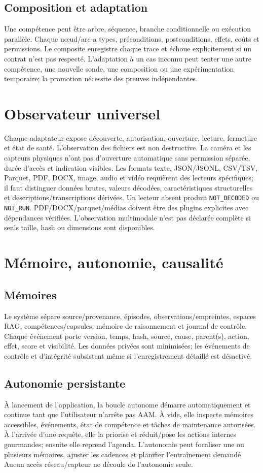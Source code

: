 \documentclass[11pt,a4paper]{report}
\begin{document}
\section{Composition et adaptation}Une compétence peut être arbre, séquence, branche conditionnelle ou exécution parallèle. Chaque nœud/arc a types, préconditions, postconditions, effets, coûts et permissions. Le composite enregistre chaque trace et échoue explicitement si un contrat n'est pas respecté. L'adaptation à un cas inconnu peut tenter une autre compétence, une nouvelle sonde, une composition ou une expérimentation temporaire; la promotion nécessite des preuves indépendantes.

\chapter{Observateur universel}
Chaque adaptateur expose découverte, autorisation, ouverture, lecture, fermeture et état de santé. L'observation des fichiers est non destructive. La caméra et les capteurs physiques n'ont pas d'ouverture automatique sans permission séparée, durée d'accès et indication visibles. Les formats texte, JSON/JSONL, CSV/TSV, Parquet, PDF, DOCX, image, audio et vidéo requièrent des lecteurs spécifiques; il faut distinguer données brutes, valeurs décodées, caractéristiques structurelles et descriptions/transcriptions dérivées. Un lecteur absent produit \texttt{NOT\_DECODED} ou \texttt{NOT\_RUN}. PDF/DOCX/parquet/médias doivent être des plugins explicites avec dépendances vérifiées. L'observation multimodale n'est pas déclarée complète si seuls taille, hash ou dimensions sont disponibles.

\chapter{Mémoire, autonomie, causalité}
\section{Mémoires}Le système sépare source/provenance, épisodes, observations/empreintes, espaces RAG, compétences/capsules, mémoire de raisonnement et journal de contrôle. Chaque événement porte version, temps, hash, source, cause, parent(s), action, effet, score et visibilité. Les données privées sont minimisées; les événements de contrôle et d'intégrité subsistent même si l'enregistrement détaillé est désactivé.
\section{Autonomie persistante}À lancement de l'application, la boucle autonome démarre automatiquement et continue tant que l'utilisateur n'arrête pas AAM. À vide, elle inspecte mémoires accessibles, événements, état de compétence et tâches de maintenance autorisées. À l'arrivée d'une requête, elle la priorise et réduit/pose les actions internes gourmandes; ensuite elle reprend l'agenda. L'autonomie peut focaliser une ou plusieurs mémoires, ajuster les cadences et planifier l'entraînement demandé. Aucun accès réseau/capteur ne découle de l'autonomie seule.
\end{document}
